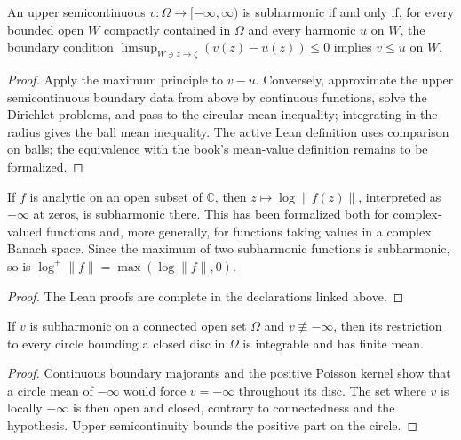 \begin{theorem}
  \label{thm:I_6_3}
  \notready
  An upper semicontinuous $v:\Omega\to[-\infty,\infty)$ is subharmonic if
  and only if, for every bounded open $W$ compactly contained in $\Omega$
  and every harmonic $u$ on $W$, the boundary condition
  $\limsup_{W\ni z\to\zeta}(v(z)-u(z))\le0$ implies $v\le u$ on $W$.
  \begin{proof}
    \notready
    Apply the maximum principle to $v-u$. Conversely, approximate the
    upper semicontinuous boundary data from above by continuous functions,
    solve the Dirichlet problems, and pass to the circular mean inequality;
    integrating in the radius gives the ball mean inequality.
    The active Lean definition uses comparison on balls; the equivalence
    with the book's mean-value definition remains to be formalized.
  \end{proof}
\end{theorem}

\begin{theorem}
  \label{thm:log_abs_subharmonic}
  \leanok
  If $f$ is analytic on an open subset of $\mathbb{C}$, then
  $z\mapsto \log \lVert f(z)\rVert$, interpreted as $-\infty$ at zeros, is
  subharmonic there. This has been formalized both for complex-valued
  functions and, more generally, for functions taking values in a complex
  Banach space. Since the maximum of two subharmonic functions is
  subharmonic, so is $\log^+\lVert f\rVert=\max(\log\lVert f\rVert,0)$.
  \begin{proof}
    \leanok
    The Lean proofs are complete in the declarations linked above.
  \end{proof}
\end{theorem}

\begin{corollary}
  \label{cor:I_6_4}
  \notready
  If $v$ is subharmonic on a connected open set $\Omega$ and
  $v\not\equiv-\infty$, then its restriction to every circle bounding a
  closed disc in $\Omega$ is integrable and has finite mean.
  \begin{proof}
    \notready
    Continuous boundary majorants and the positive Poisson kernel show that
    a circle mean of $-\infty$ would force $v=-\infty$ throughout its disc.
    The set where $v$ is locally $-\infty$ is then open and closed, contrary
    to connectedness and the hypothesis. Upper semicontinuity bounds the
    positive part on the circle.
  \end{proof}
\end{corollary}

